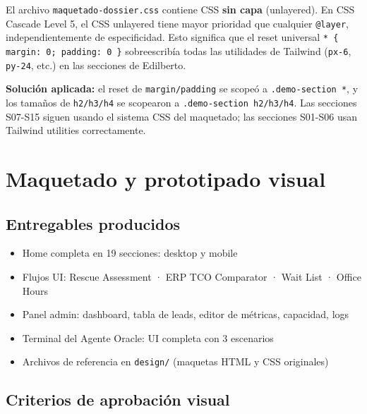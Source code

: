 \documentclass[11pt, a4paper]{article}
\newcommand{\ruta}[1]{\texttt{\color{accent2}#1}}
\begin{document}
\begin{notatec}
El archivo \ruta{maquetado-dossier.css} contiene CSS \textbf{sin capa} (unlayered).
En CSS Cascade Level 5, el CSS unlayered tiene mayor prioridad que cualquier
\texttt{@layer}, independientemente de especificidad. Esto significa que el reset
universal \texttt{* \{ margin: 0; padding: 0 \}} sobreescribía todas las utilidades
de Tailwind (\texttt{px-6}, \texttt{py-24}, etc.) en las secciones de Edilberto.

\textbf{Solución aplicada:} el reset de \texttt{margin/padding} se scopeó a
\texttt{.demo-section *}, y los tamaños de \texttt{h2/h3/h4} se scopearon a
\texttt{.demo-section h2/h3/h4}. Las secciones S07-S15 siguen usando el sistema CSS
del maquetado; las secciones S01-S06 usan Tailwind utilities correctamente.
\end{notatec}

\newpage


\section{Maquetado y prototipado visual}

\subsection{Entregables producidos}

\begin{itemize}[leftmargin=*]
  \item Home completa en 19 secciones: desktop y mobile
  \item Flujos UI: Rescue Assessment · ERP TCO Comparator · Wait List · Office Hours
  \item Panel admin: dashboard, tabla de leads, editor de métricas, capacidad, logs
  \item Terminal del Agente Oracle: UI completa con 3 escenarios
  \item Archivos de referencia en \ruta{design/} (maquetas HTML y CSS originales)
\end{itemize}

\subsection{Criterios de aprobación visual}
\end{document}
